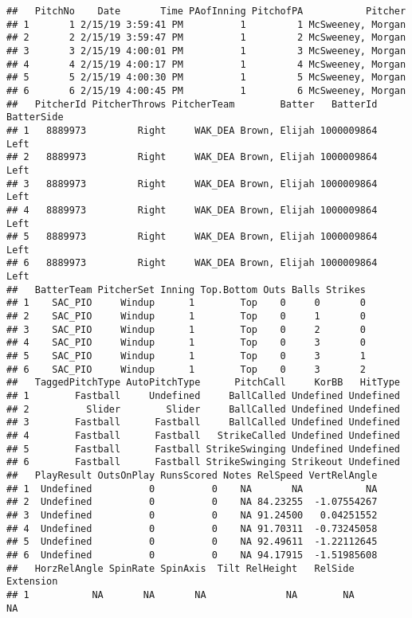 \documentclass[]{article}
\begin{document}
\begin{verbatim}
##   PitchNo    Date       Time PAofInning PitchofPA           Pitcher
## 1       1 2/15/19 3:59:41 PM          1         1 McSweeney, Morgan
## 2       2 2/15/19 3:59:47 PM          1         2 McSweeney, Morgan
## 3       3 2/15/19 4:00:01 PM          1         3 McSweeney, Morgan
## 4       4 2/15/19 4:00:17 PM          1         4 McSweeney, Morgan
## 5       5 2/15/19 4:00:30 PM          1         5 McSweeney, Morgan
## 6       6 2/15/19 4:00:45 PM          1         6 McSweeney, Morgan
##   PitcherId PitcherThrows PitcherTeam        Batter   BatterId BatterSide
## 1   8889973         Right     WAK_DEA Brown, Elijah 1000009864       Left
## 2   8889973         Right     WAK_DEA Brown, Elijah 1000009864       Left
## 3   8889973         Right     WAK_DEA Brown, Elijah 1000009864       Left
## 4   8889973         Right     WAK_DEA Brown, Elijah 1000009864       Left
## 5   8889973         Right     WAK_DEA Brown, Elijah 1000009864       Left
## 6   8889973         Right     WAK_DEA Brown, Elijah 1000009864       Left
##   BatterTeam PitcherSet Inning Top.Bottom Outs Balls Strikes
## 1    SAC_PIO     Windup      1        Top    0     0       0
## 2    SAC_PIO     Windup      1        Top    0     1       0
## 3    SAC_PIO     Windup      1        Top    0     2       0
## 4    SAC_PIO     Windup      1        Top    0     3       0
## 5    SAC_PIO     Windup      1        Top    0     3       1
## 6    SAC_PIO     Windup      1        Top    0     3       2
##   TaggedPitchType AutoPitchType      PitchCall     KorBB   HitType
## 1        Fastball     Undefined     BallCalled Undefined Undefined
## 2          Slider        Slider     BallCalled Undefined Undefined
## 3        Fastball      Fastball     BallCalled Undefined Undefined
## 4        Fastball      Fastball   StrikeCalled Undefined Undefined
## 5        Fastball      Fastball StrikeSwinging Undefined Undefined
## 6        Fastball      Fastball StrikeSwinging Strikeout Undefined
##   PlayResult OutsOnPlay RunsScored Notes RelSpeed VertRelAngle
## 1  Undefined          0          0    NA       NA           NA
## 2  Undefined          0          0    NA 84.23255  -1.07554267
## 3  Undefined          0          0    NA 91.24500   0.04251552
## 4  Undefined          0          0    NA 91.70311  -0.73245058
## 5  Undefined          0          0    NA 92.49611  -1.22112645
## 6  Undefined          0          0    NA 94.17915  -1.51985608
##   HorzRelAngle SpinRate SpinAxis  Tilt RelHeight   RelSide Extension
## 1           NA       NA       NA              NA        NA        NA

\end{verbatim}
\end{document}
